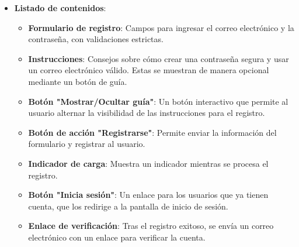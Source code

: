 \documentclass{article}
\begin{document}
\begin{flushleft}
\begin{itemize}
    \item \textbf{Listado de contenidos}: 
    \begin{itemize}
        \item \textbf{Formulario de registro}: Campos para ingresar el correo electr\'onico y la contrase\~na, con validaciones estrictas.
        \item \textbf{Instrucciones}: Consejos sobre c\'omo crear una contrase\~na segura y usar un correo electr\'onico v\'alido. Estas se muestran de manera opcional mediante un bot\'on de gu\'ia.
        \item \textbf{Bot\'on "Mostrar/Ocultar gu\'ia"}: Un bot\'on interactivo que permite al usuario alternar la visibilidad de las instrucciones para el registro.
        \item \textbf{Bot\'on de acci\'on "Registrarse"}: Permite enviar la informaci\'on del formulario y registrar al usuario.
        \item \textbf{Indicador de carga}: Muestra un indicador mientras se procesa el registro.
        \item \textbf{Bot\'on "Inicia sesi\'on"}: Un enlace para los usuarios que ya tienen cuenta, que los redirige a la pantalla de inicio de sesi\'on.
        \item \textbf{Enlace de verificaci\'on}: Tras el registro exitoso, se env\'ia un correo electr\'onico con un enlace para verificar la cuenta.
    \end{itemize}


\end{itemize}
\end{flushleft}
\end{document}
